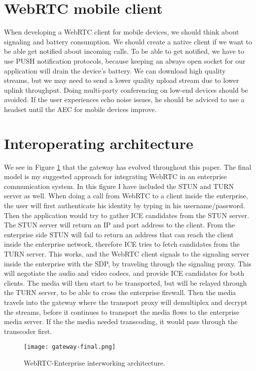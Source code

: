 \section{WebRTC mobile client}
When developing a WebRTC client for mobile devices, we should think about signaling and battery consumption. We should create a native client if we want to be able get notified about incoming calls. To be able to get notified, we have to use PUSH notification protocols, because keeping an always open socket for our application will drain the device's battery. We can download high quality streams, but we may need to send a lower quality upload stream due to lower uplink throughput. Doing multi-party conferencing on low-end devices should be avoided. If the user experiences echo noise issues, he should be adviced to use a headset until the AEC for mobile devices improve.

\section{Interoperating architecture}

We see in Figure \ref{fig:gateway-final} that the gateway has evolved throughout this paper. The final model is my suggested approach for integrating WebRTC in an enterprise communication system. In this figure I have included the STUN and TURN server as well. When doing a call from WebRTC to a client inside the enterprise, the user will first authenticate his identity by typing in his username/password. Then the application would try to gather ICE candidates from the STUN server. The STUN server will return an IP and port address to the client. From the enterprise side STUN will fail to return an address that can reach the client inside the enterprise network, therefore ICE tries to fetch candidates from the TURN server. This works, and the WebRTC client signals to the signaling server inside the enterprise with the SDP, by traveling through the signaling proxy. This will negotiate the audio and video codecs, and provide ICE candidates for both clients. The media will then start to be transported, but will be relayed through the TURN server, to be able to cross the enterprise firewall. Then the media travels into the gateway where the transport proxy will demultiplex and decrypt the streams, before it continues to transport the media flows to the enterprise media server. If the the media needed transcoding, it would pass through the transcoder first.
\\
\begin{figure}[here]
\centerline{\texttt{[image: gateway-final.png]}}
\caption{WebRTC-Enterprise interworking architecture.}
\label{fig:gateway-final}
\end{figure}


